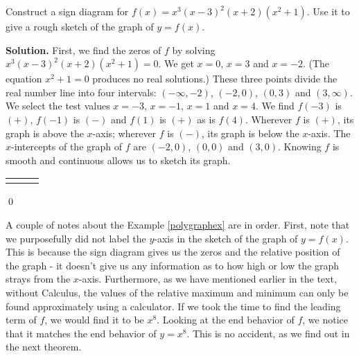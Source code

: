 \smallskip
\smallskip 

\begin{example}  Construct a sign diagram for $f(x) = x^3 (x-3)^2 (x+2) \left(x^2+1\right)$.   Use it to give a rough sketch of the graph of  $y=f(x)$.  \label{polygraphex}

\smallskip

{\bf Solution.}  First, we find the zeros of $f$ by solving $x^3 (x-3)^2 (x+2)\left(x^2+1\right)=0$.   We get $x=0$, $x=3$ and $x=-2$. (The equation $x^2+1=0$ produces no real solutions.)  These three points divide the real number line into four intervals:  $(-\infty, -2)$, $(-2,0)$, $(0,3)$ and $(3,\infty)$.  We select the test values $x=-3$, $x=-1$, $x=1$ and $x=4$. We find $f(-3)$ is $(+)$, $f(-1)$ is $(-)$ and $f(1)$ is $(+)$ as is $f(4)$.  Wherever $f$ is $(+)$, its graph is above the $x$-axis;  wherever $f$ is $(-)$, its graph is below the $x$-axis.  The $x$-intercepts of the graph of $f$ are $(-2,0)$, $(0,0)$ and $(3,0)$.  Knowing $f$ is smooth and continuous allows us to sketch its graph.

\begin{tabular}{m{0.5in}m{2.5in}m{2.5in}}

&


 

&


 

\end{tabular}

\vspace{-.35in}

\qed

\end{example}

A couple of notes about the Example \ref{polygraphex} are in order.  First, note that we purposefully did not label the $y$-axis in the sketch of the graph of $y=f(x)$.  This is because the sign diagram gives us the zeros and the relative position of the graph - it doesn't give us any information as to how high or low the graph strays from the $x$-axis.  Furthermore, as we have mentioned earlier in the text, without Calculus, the values of the relative maximum and minimum can only be found approximately using a calculator.  If we took the time to find the leading term of $f$, we would find it to be $x^8$.  Looking at the end behavior of $f$, we notice that it matches the end behavior of $y=x^8$.  This is no accident, as we find out in the next theorem.



